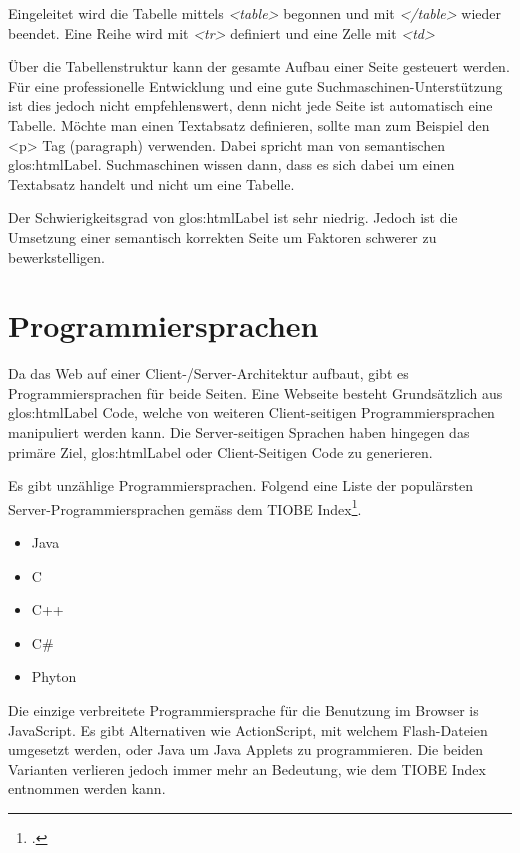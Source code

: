 Eingeleitet wird die Tabelle mittels \textit{<table>} begonnen und mit \textit{</table>} wieder beendet. Eine Reihe wird mit \textit{<tr>} definiert und eine Zelle mit \textit{<td>}

Über die Tabellenstruktur kann der gesamte Aufbau einer Seite gesteuert werden. Für eine professionelle Entwicklung und eine gute Suchmaschinen-Unterstützung ist dies jedoch nicht empfehlenswert, denn nicht jede Seite ist automatisch eine Tabelle. Möchte man einen Textabsatz definieren, sollte man zum Beispiel den <p> Tag (paragraph) verwenden. Dabei spricht man von semantischen \Gls{glos:htmlLabel}. Suchmaschinen wissen dann, dass es sich dabei um einen Textabsatz handelt und nicht um eine Tabelle.

Der Schwierigkeitsgrad von \Gls{glos:htmlLabel} ist sehr niedrig. Jedoch ist die Umsetzung einer semantisch korrekten Seite um Faktoren schwerer zu bewerkstelligen.

\section{Programmiersprachen}
Da das Web auf einer  Client-/Server-Architektur aufbaut, gibt es Programmiersprachen für beide Seiten. Eine Webseite besteht Grundsätzlich aus \Gls{glos:htmlLabel} Code, welche von weiteren Client-seitigen Programmiersprachen manipuliert werden kann. Die Server-seitigen Sprachen haben hingegen das primäre Ziel, \Gls{glos:htmlLabel} oder Client-Seitigen Code zu generieren.

Es gibt unzählige Programmiersprachen. Folgend eine Liste der populärsten Server-Programmiersprachen gemäss dem TIOBE Index\footcite{TIOBE_Software_Tiobe_Index_2015-06-04}.

\begin{itemize}
\item Java
\item C
\item C++
\item C\#
\item Phyton
\end{itemize}

Die einzige verbreitete Programmiersprache für die Benutzung im Browser is JavaScript. Es gibt Alternativen wie ActionScript, mit welchem Flash-Dateien umgesetzt werden, oder Java um Java Applets zu programmieren. Die beiden Varianten verlieren jedoch immer mehr an Bedeutung, wie dem TIOBE Index entnommen werden kann.

